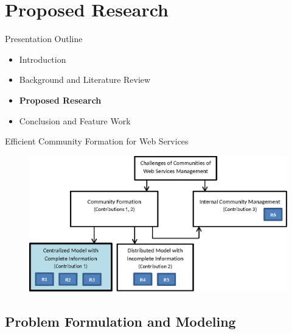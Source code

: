 \documentclass{beamer}
\begin{document}


\section{Proposed Research}
\begin{frame}{Presentation Outline}
    \begin{itemize}
     	\itemsep=.5cm
    	\item Introduction
    	\item Background and Literature Review
    	\item {\bf Proposed Research}
    	\item Conclusion and Feature Work
    \end{itemize}
\end{frame}


\begin{frame}{Efficient Community Formation for Web Services}
    \begin{figure}[htbp]
        \centering
        \includegraphics[width=0.9 \columnwidth]{figures/model_c1.eps}
    \end{figure}
\end{frame}


\subsection{Problem Formulation and Modeling}
\end{document}
